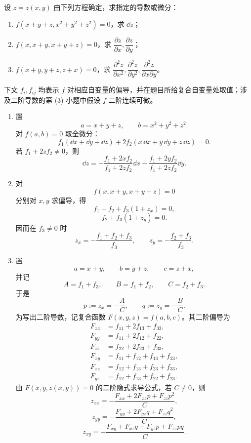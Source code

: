 \begin{xexercise}[4]
设 $z=z(x,y)$ 由下列方程确定，求指定的导数或微分：
  \begin{enumerate}[label=(\arabic*)]
    \item $f(x+y+z,x^2+y^2+z^2)=0$，求 $\dd z$；
    \item $f(x,x+y,x+y+z)=0$，求 $\dfrac{\partial z}{\partial x},\dfrac{\partial z}{\partial y}$；
    \item $f(x+y,y+z,z+x)=0$，求 $\dfrac{\partial^2z}{\partial x^2},\dfrac{\partial^2z}{\partial y^2},\dfrac{\partial^2z}{\partial x\partial y}$。
  \end{enumerate}
\end{xexercise}
\begin{xsolution}
下文 $f_i,f_{ij}$ 均表示 $f$ 对相应自变量的偏导，并在题目所给复合自变量处取值；涉及二阶导数的第 (3) 小题中假设 $f$ 二阶连续可微。

\begin{enumerate}[label=(\arabic*)]
  \item 置
  \[
    a=x+y+z,\qquad b=x^2+y^2+z^2.
  \]
  对 $f(a,b)=0$ 取全微分：
  \[
    f_1(\dd x+\dd y+\dd z)
    +2f_2(x\,\dd x+y\,\dd y+z\,\dd z)=0.
  \]
  若 $f_1+2zf_2\ne0$，则
  \[
    \boxed{\displaystyle
    \dd z=-\frac{f_1+2xf_2}{f_1+2zf_2}\dd x
           -\frac{f_1+2yf_2}{f_1+2zf_2}\dd y}.
  \]

  \item 对
  \[
    f(x,x+y,x+y+z)=0
  \]
  分别对 $x,y$ 求偏导，得
  \[
    f_1+f_2+f_3(1+z_x)=0,
  \]
  \[
    f_2+f_3(1+z_y)=0.
  \]
  因而在 $f_3\ne0$ 时
  \[
    \boxed{\displaystyle
      z_x=-\frac{f_1+f_2+f_3}{f_3},\qquad
      z_y=-\frac{f_2+f_3}{f_3}}.
  \]

  \item 置
  \[
    a=x+y,\qquad b=y+z,\qquad c=z+x,
  \]
  并记
  \[
    A=f_1+f_3,\qquad B=f_1+f_2,\qquad C=f_2+f_3.
  \]
  于是
  \[
    p:=z_x=-\frac AC,
    \qquad
    q:=z_y=-\frac BC.
  \]
  为写出二阶导数，记复合函数 $F(x,y,z)=f(a,b,c)$。其二阶偏导为
  \begin{align*}
    F_{xx}&=f_{11}+2f_{13}+f_{33},\\
    F_{yy}&=f_{11}+2f_{12}+f_{22},\\
    F_{zz}&=f_{22}+2f_{23}+f_{33},\\
    F_{xy}&=f_{11}+f_{12}+f_{13}+f_{23},\\
    F_{xz}&=f_{12}+f_{13}+f_{23}+f_{33},\\
    F_{yz}&=f_{12}+f_{13}+f_{22}+f_{23}.
  \end{align*}
  由 $F(x,y,z(x,y))=0$ 的二阶隐式求导公式，若 $C\ne0$，则
  \[
    \boxed{\displaystyle
      z_{xx}=-\frac{F_{xx}+2F_{xz}p+F_{zz}p^2}{C}},
  \]
  \[
    \boxed{\displaystyle
      z_{yy}=-\frac{F_{yy}+2F_{yz}q+F_{zz}q^2}{C}},
  \]
  \[
    \boxed{\displaystyle
      z_{xy}=-\frac{F_{xy}+F_{xz}q+F_{yz}p+F_{zz}pq}{C}}.
  \]
\end{enumerate}
\end{xsolution}


